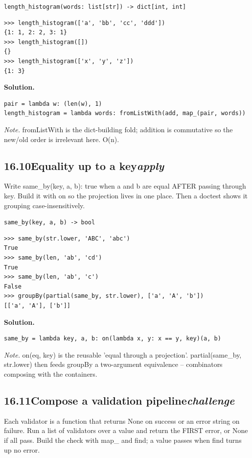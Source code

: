 \documentclass[10pt,letterpaper]{book}
\begin{document}
\noindent\texttt{length\_histogram(words: list[str]) -> dict[int, int]}
\begin{lstlisting}[style=ex]
>>> length_histogram(['a', 'bb', 'cc', 'ddd'])
{1: 1, 2: 2, 3: 1}
>>> length_histogram([])
{}
>>> length_histogram(['x', 'y', 'z'])
{1: 3}
\end{lstlisting}
\noindent\textbf{Solution.}
\begin{lstlisting}[style=code]
pair = lambda w: (len(w), 1)
length_histogram = lambda words: fromListWith(add, map_(pair, words))
\end{lstlisting}
\noindent\textit{Note.} fromListWith is the dict-building fold; addition is commutative so the new/old order is irrelevant here. O(n).

\subsection*{16.10\quad Equality up to a key\hfill\textnormal{\textit{apply}}}
Write same\_by(key, a, b): true when a and b are equal AFTER passing through key. Build it with on so the projection lives in one place. Then a doctest shows it grouping case-insensitively.

\noindent\texttt{same\_by(key, a, b) -> bool}
\begin{lstlisting}[style=ex]
>>> same_by(str.lower, 'ABC', 'abc')
True
>>> same_by(len, 'ab', 'cd')
True
>>> same_by(len, 'ab', 'c')
False
>>> groupBy(partial(same_by, str.lower), ['a', 'A', 'b'])
[['a', 'A'], ['b']]
\end{lstlisting}
\noindent\textbf{Solution.}
\begin{lstlisting}[style=code]
same_by = lambda key, a, b: on(lambda x, y: x == y, key)(a, b)
\end{lstlisting}
\noindent\textit{Note.} on(eq, key) is the reusable 'equal through a projection'. partial(same\_by, str.lower) then feeds groupBy a two-argument equivalence -- combinators composing with the containers.

\subsection*{16.11\quad Compose a validation pipeline\hfill\textnormal{\textit{challenge}}}
Each validator is a function that returns None on success or an error string on failure. Run a list of validators over a value and return the FIRST error, or None if all pass. Build the check with map\_ and find; a value passes when find turns up no error.
\end{document}
